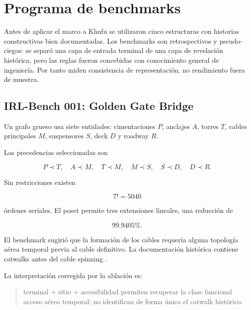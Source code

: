 
\section{Programa de benchmarks}

Antes de aplicar el marco a Khufu se utilizaron cinco estructuras con historias constructivas bien documentadas. Los benchmarks son retrospectivos y pseudo-ciegos: se separó una capa de entrada terminal de una capa de revelación histórica, pero las reglas fueron concebidas con conocimiento general de ingeniería. Por tanto miden consistencia de representación, no rendimiento fuera de muestra.

\subsection{IRL-Bench 001: Golden Gate Bridge}

Un grafo grueso usa siete entidades: cimentaciones \(P\), anclajes \(A\), torres \(T\), cables principales \(M\), suspensores \(S\), deck \(D\) y roadway \(R\).

Las precedencias seleccionadas son

\begin{equation}
P\prec T,
\quad
A\prec M,
\quad
T\prec M,
\quad
M\prec S,
\quad
S\prec D,
\quad
D\prec R.
\end{equation}

Sin restricciones existen

\begin{equation}
7!=5040
\end{equation}

órdenes seriales. El poset permite tres extensiones lineales, una reducción de

\begin{equation}
\boxed{
99.9405\%.
}
\end{equation}

El benchmark sugirió que la formación de los cables requería alguna topología aérea temporal previa al cable definitivo. La documentación histórica contiene catwalks antes del cable spinning \cite{ggbconstruction,ggbtowers,ggbcables,ggbdeck}.

La interpretación corregida por la ablación es:

\begin{quote}
terminal + sitio + accesibilidad permiten recuperar la clase funcional acceso aéreo temporal; no identifican de forma única el catwalk histórico.
\end{quote}

